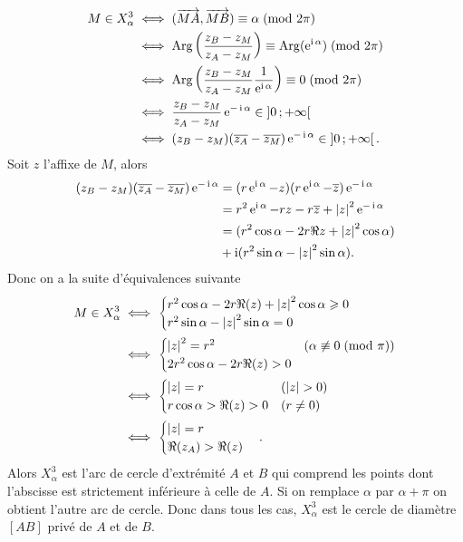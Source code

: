 \begin{align}
  M \in X_{\alpha}^3 & \iff (\overrightarrow{MA},\overrightarrow{MB}) \equiv \alpha\!\pmod {2\pi} \\
& \iff \operatorname{Arg}\left(\frac{z_B-z_M}{z_A-z_M}\right) \equiv \operatorname{Arg}(\operatorname{e}^{\operatorname{i} \alpha})\!\pmod {2\pi}\\
& \iff \operatorname{Arg}\left(\frac{z_B-z_M}{z_A-z_M} \frac{1}{\operatorname{e}^{\operatorname{i} \alpha}}\right) \equiv 0\!\pmod {2\pi}\\
& \iff \frac{z_B-z_M}{z_A-z_M} \operatorname{e}^{-\operatorname{i} \alpha} \in \left] 0 \, ;  +\infty \right[\\
& \iff (z_B-z_M)(\overline{z_A}-\overline{z_M})\operatorname{e}^{-\operatorname{i} \alpha} \in \left] 0 \, ;  +\infty \right[.
\end{align}
Soit \(z\) l'affixe de \(M\), alors
\begin{align}
  (z_B-z_M)(\overline{z_A}-\overline{z_M})\operatorname{e}^{-\operatorname{i} \alpha} & = (r\operatorname{e}^{\operatorname{i} \alpha} - z)(r\operatorname{e}^{\operatorname{i} \alpha} - \overline{z})\operatorname{e}^{-\operatorname{i} \alpha}\\
&=r^2 \operatorname{e}^{\operatorname{i} \alpha} -rz-r\overline{z}+\left\lvert z\right\rvert^2\operatorname{e}^{-\operatorname{i} \alpha}\\
&=(r^2\cos \alpha - 2r\Re{z}+\left\lvert z\right\rvert^2\cos \alpha) \\ 
&+ \operatorname{i}(r^2\sin \alpha - \left\lvert z\right\rvert^2\sin \alpha).
\end{align}
Donc on a la suite d'équivalences suivante
\begin{align}
  M \in X_{\alpha}^3 & \iff \begin{cases} r^2\cos \alpha - 2r\Re(z)+\left\lvert z\right\rvert^2\cos \alpha \geqslant 0 \\ r^2\sin \alpha - \left\lvert z\right\rvert^2\sin \alpha  = 0\end{cases}\\
& \iff \begin{cases}\left\lvert z\right\rvert^2=r^2 & (\alpha \not\equiv 0\!\pmod {\pi}) \\ 2r^2\cos \alpha - 2r \Re(z)>0&\end{cases}\\
& \iff \begin{cases}\left\lvert z\right\rvert=r & (\left\lvert z\right\rvert>0)\\ r\cos \alpha > \Re(z)>0& (r\neq 0)\end{cases}\\
& \iff \begin{cases}\left\lvert z\right\rvert=r \\ \Re(z_A) > \Re(z)\end{cases}.
\end{align}
Alors \(X_{\alpha}^{3}\) est l'arc de cercle d'extrémité \(A\) et \(B\) qui comprend les points dont l'abscisse est strictement inférieure à celle de \(A\). Si on remplace \(\alpha\) par \(\alpha+\pi\) on obtient l'autre arc de cercle. Donc dans tous les cas, \(X_{\alpha}^3\) est le cercle de diamètre \([AB]\) privé de \(A\) et de \(B\).

